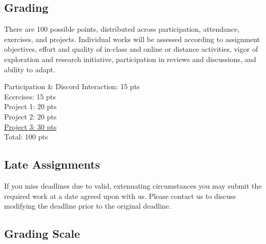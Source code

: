 \subsection{Grading}

There are 100 possible points, distributed across participation, attendance, exercises, and projects. Individual works will be assessed according to assignment objectives, effort and quality of in-class and online or distance activities, vigor of exploration and research initiative, participation in reviews and discussions, and ability to adapt.

\hspace*{1em} Participation \& Discord Interaction: 15 pts\\
\hspace*{1em} Ecercises: 15 pts\\
\hspace*{1em} Project 1: 20 pts\\
\hspace*{1em} Project 2: 20 pts\\
\hspace*{1em} \ul{Project 3: 30 pts}\\
\hspace*{1em} Total: 100 pts

\subsection{Late Assignments}

If you miss deadlines due to valid, extenuating circumstances you may submit the required work at a date agreed upon with us. Please contact us to discuss modifying the deadline prior to the original deadline.

\subsection{Grading Scale}

